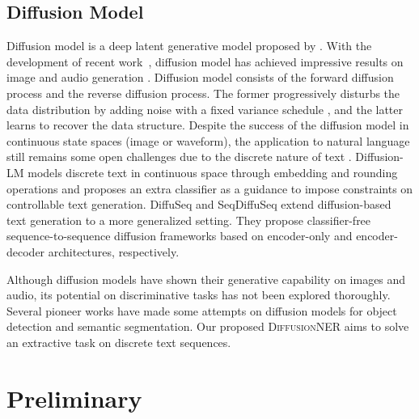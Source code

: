 \documentclass[11pt]{article}
\begin{document}
\subsection{Diffusion Model}
Diffusion model is a deep latent generative model proposed by \citep{pmlr-v37-sohl-dickstein15}. With the development of recent work~\citep{ddpm}, diffusion model has achieved impressive results on image and audio generation \citep{rombach2021highresolution, dalle2, kong2021diffwave}. Diffusion model consists of the forward diffusion process and the reverse diffusion process. The former progressively disturbs the data distribution by adding noise with a fixed variance schedule \citep{ddpm}, and the latter learns to recover the data structure. Despite the success of the diffusion model in continuous state spaces (image or waveform), the application to natural language still remains some open challenges due to the discrete nature of text \citep{NEURIPS2021_958c5305, hoogeboom2022autoregressive, Self_conditioned_Embedding_Diffusion, DiffusionBERT}. Diffusion-LM \citep{Li-2022-DiffusionLM} models discrete text in continuous space through embedding and rounding operations and proposes an extra classifier as a guidance to impose constraints on controllable text generation. DiffuSeq \citep{gong2022diffuseq} and SeqDiffuSeq \citep{SeqDiffuSeq} extend diffusion-based text generation to a more generalized setting. They propose classifier-free sequence-to-sequence diffusion frameworks based on encoder-only and encoder-decoder architectures, respectively. 

Although diffusion models have shown their generative capability on images and audio, its potential on discriminative tasks has not been explored thoroughly.
Several pioneer works \citep{SegDiff, baranchuk2022labelefficient, diffusiondet} have made some attempts on diffusion models for object detection and semantic segmentation.
Our proposed \textsc{DiffusionNER} aims to  solve an extractive task on discrete text sequences.



\section{Preliminary}
\label{sec:3.1}
\end{document}
